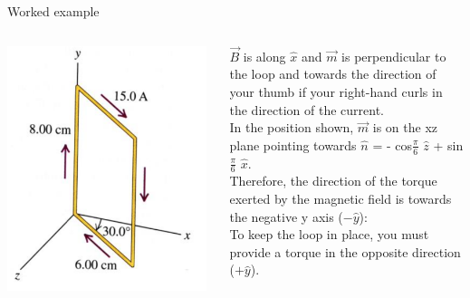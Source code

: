 {\begin{frame}{Worked example}
\begin{columns}[T]
  \begin{column}{0.30\textwidth}
    \begin{center}
      \includegraphics[width=0.98\textwidth]{./images/problems/lect5_rectangular_loop}\\
    \end{center}
  \end{column}
  \begin{column}{0.70\textwidth}
   {\small
         $\vec{B}$ is along $\hat{x}$ and $\vec{m}$ is perpendicular to the loop and towards the direction of
         your thumb if your right-hand curls in the direction of the
         current. \\
         \vspace{0.2cm}
         In the position shown, $\vec{m}$
         is on the xz plane pointing towards
         $\hat{n}$ = - cos$\displaystyle \frac{\pi}{6}$ $\hat{z}$ + sin$\displaystyle \frac{\pi}{6}$ $\hat{x}$.\\
         \vspace{0.2cm}
         Therefore, the direction of the torque exerted by the
         magnetic field is towards the negative y axis ($-\hat{y}$):\\
         To keep the loop in place,
         you must provide a torque in the opposite direction  ($+\hat{y}$).\\
   }
  \end{column}
\end{columns}


\end{frame}}
